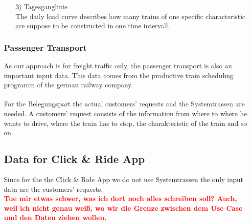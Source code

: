 \begin{itemize}
	\item[3)] Tagesganglinie \\
	The daily load curve describes how many trains of one specific characteristic are suppose to be constructed in one time intervall. 
\end{itemize}

\subsubsection{Passenger Transport}
As our approach is for freight traffic only, the passenger transport is also an important input data. This data comes from the productive train scheduling programm of the german railway company. \\ 
\\
For the Belegungspart the actual customers' requests and the Systemtrassen are needed. A customers' request consists of the information from where to where he wants to drive, where the train has to stop, the charakteristic of the train and so on.\\


\subsection{Data for Click \& Ride App}
\label{chap:dataCnR}
Since for the the Click \& Ride App we do not use Systemtrassen the only input data are the customers' requests. 
\\
\textbf{\textcolor{red}{Tue mir etwas schwer, was ich dort noch alles schreiben soll? Auch, weil ich nicht genau weiß, wo wir die Grenze zwischen dem Use Case und den Daten ziehen wollen.}}